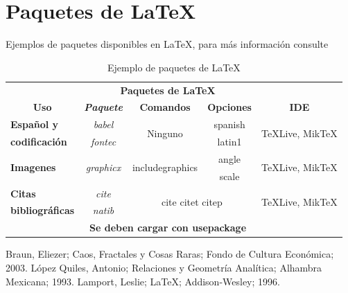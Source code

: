 \documentclass[letterpaper,12pt]{article}
\begin{document}
\begin{table}[h!]
\begin{tabular}{|ccccc|}
\hline
\end{tabular}
\end{table}

\newpage

\section{Paquetes de \LaTeX{}}
Ejemplos de paquetes disponibles en \LaTeX{}, para más información consulte  \cite{Lamport}

\begin{table}[h!]
\centering
\begin{tabular}{|c|c|c|c|c|}
\cline{2-4}
\multicolumn{1}{c}{}& \multicolumn{3}{|c|}{\multirow{2}{*}{\textbf{Paquetes de \LaTeX{}}}}& \multicolumn{1}{c}{} \\ \cline{1-1}\cline{5-5}
\multicolumn{1}{|c}{}& \multicolumn{3}{c}{} &  \\ \hline
\textbf{Uso} & \textbf{\textit{Paquete}} & \textbf{Comandos} & \textbf{Opciones} & \textbf{IDE}\\ \hline \hline
\multicolumn{1}{|l|}{\textbf{Español y}} & \textit{babel} & \multirow{2}{*}{Ninguno} & spanish & \multirow{2}{*}{TeXLive, MikTeX}\\ 
\cline{2-2} \cline{4-4}
\multicolumn{1}{|l|}{\textbf{codificación}} & \textit{fontec} & & latin1 & \\ \hline \hline 
\multicolumn{1}{|l|}{\multirow{2}{*}{\textbf{Imagenes}}} & \multirow{2}{*}{\textit{graphicx}} & \multirow{2}{*}{includegraphics} & angle & \multirow{2}{*}{TeXLive, MikTeX}\\ 
\cline{4-4}
 & & & scale & \\ \hline \hline
\multicolumn{1}{|l|}{\textbf{Citas}} & \textit{cite} & \multicolumn{2}{|c|}{\multirow{2}{*}{cite citet citep}} & \multirow{2}{*}{TeXLive, MikTeX}\\
\cline{2-2} 
\textbf{bibliográficas} & \textit{natib} & \multicolumn{2}{|c|}{}& \\ \hline
\multicolumn{1}{|c}{} & \multicolumn{3}{c}{\multirow{2}{*}{{\textbf{Se deben cargar con usepackage}}}} & \multicolumn{1}{c|}{} \\ 
 \cline{1-1}\cline{5-5}
\multicolumn{1}{c}{} & \multicolumn{3}{|c|}{}& \multicolumn{1}{c}{} \\ \cline{2-4} 
\end{tabular}
\caption{Ejemplo de paquetes de LaTeX{}}
\end{table}



\begin{thebibliography}{99}
 Braun, Eliezer; Caos, Fractales y Cosas Raras; Fondo de Cultura Económica; 2003.
 López Quiles, Antonio; Relaciones y Geometría Analítica; Alhambra Mexicana; 1993.
 Lamport, Leslie; \LaTeX{}; Addison-Wesley; 1996.
\end{thebibliography}
\end{document}
